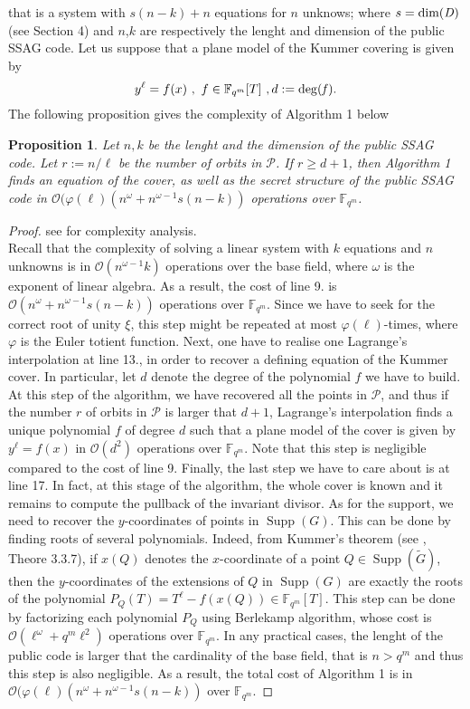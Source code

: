 \documentclass[10pt]{article}
\newtheorem{prop1}[thm]{Proposition}
\newcommand{\s}{\vspace{0.3cm}}
\newcommand{\calO}{\mathcal{O}}
\newcommand{\fqm}{\mathbb{F}_{q^m}}
\newcommand{\w}{\omega}
\newcommand{\PR}{\mathcal{P}}
\newcommand{\Supp}{\operatorname{Supp}}
\begin{document}
that is a system with $s(n-k)+n$ equations for $n$ unknows; where $s=\rm dim \it(D)$ (see Section 4) and $n$,$k$ are respectively the lenght and dimension of the public SSAG code. Let us suppose that a plane model of the Kummer covering is given by 
\[y^{\ell} = f(x) \ , \ f \in \fqm[T] \ , d:=\rm{deg}(\it f).\]
The following proposition gives the complexity of Algorithm 1 below

\s

\begin{prop1} Let $n,k$ be the lenght and the dimension of the public \rm{SSAG} \it code. Let $r := n/\ell$ be the number of orbits in $\PR$. If $r \geq d+1$, then Algorithm 1 finds an equation of the cover, as well as the secret structure of the public \rm SSAG \it code in $\calO(\varphi(\ell)(n^{\w}+n^{\w-1}s(n-k))$ operations over $\fqm$. 

\end{prop1}

\s

\begin{proof} see \cite{CF} for complexity analysis. \\
Recall that the complexity of solving a linear system with $k$ equations and $n$ unknowns is in $\calO(n^{\w-1}k)$ operations over the base field, where $\w$ is the exponent of linear algebra. As a result, the cost of line 9. is $\calO(n^{\w}+n^{\w-1}s(n-k))$ operations over $\fqm$. Since we have to seek for the correct root of unity $\xi$, this step might be repeated at most $\varphi(\ell)$-times, where $\varphi$ is the Euler totient function. Next, one have to realise one Lagrange's interpolation at line 13., in order to recover a defining equation of the Kummer cover. In particular, let $d$ denote the degree of the polynomial $f$ we have to build. At this step of the algorithm, we have recovered all the points in $\PR$, and thus if the number $r$ of orbits in $\PR$ is larger that $d+1$, Lagrange's interpolation finds a unique polynomial $f$ of degree $d$ such that a plane model of the cover is given by $y^{\ell}=f(x)$ in $\calO(d^2)$ operations over $\fqm$. Note that this step is negligible compared to the cost of line 9. Finally, the last step we have to care about is at line 17. In fact, at this stage of the algorithm, the whole cover is known and it remains to compute the pullback of the invariant divisor. As for the support, we need to recover the $y$-coordinates of points in $\Supp(G)$. This can be done by finding roots of several polynomials. Indeed, from Kummer's theorem (see \cite{Sti}, Theore 3.3.7), if $x(Q)$ denotes the $x$-coordinate of a point $Q \in \Supp(\tilde{G})$, then the $y$-coordinates of the extensions of $Q$ in $\Supp(G)$ are exactly the roots of the polynomial $P_Q(T)=T^{\ell}-f(x(Q)) \in \fqm[T]$. This step can be done by factorizing each polynomial $P_Q$ using Berlekamp algorithm, whose cost is $\calO(\ell^{\w}+q^m\ell^{2})$ operations over $\fqm$. In any practical cases, the lenght of the public code is larger that the cardinality of the base field, that is $n > q^m$ and thus this step is also negligible. As a result, the total cost of Algorithm 1 is in $\calO(\varphi(\ell)(n^{\w}+n^{\w-1}s(n-k))$ over $\fqm$.
\end{proof}
\end{document}
